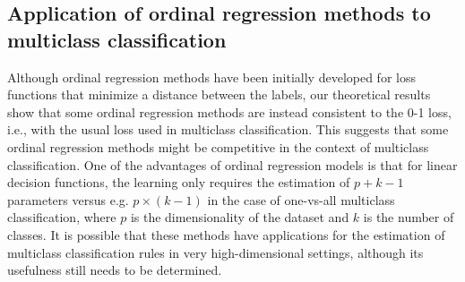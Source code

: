 




\subsection{Application of ordinal regression methods to multiclass classification }

Although ordinal regression methods have been initially developed for loss functions that minimize a distance between the labels, our theoretical results show that some ordinal regression methods are instead consistent to the 0-1 loss, i.e., with the usual loss used in multiclass classification. This suggests that some ordinal regression methods might be competitive in the context of multiclass classification. One of the advantages of ordinal regression models is that for linear decision functions, the learning only requires the estimation of $p + k - 1$ parameters versus e.g. $p\times (k-1)$ in the case of one-vs-all multiclass classification, where $p$ is the dimensionality of the dataset and $k$ is the number of classes. It is possible that these methods have applications for the estimation of multiclass classification rules in very high-dimensional settings, although its usefulness still needs to be determined.


\newpage



\vspace*{\fill}
